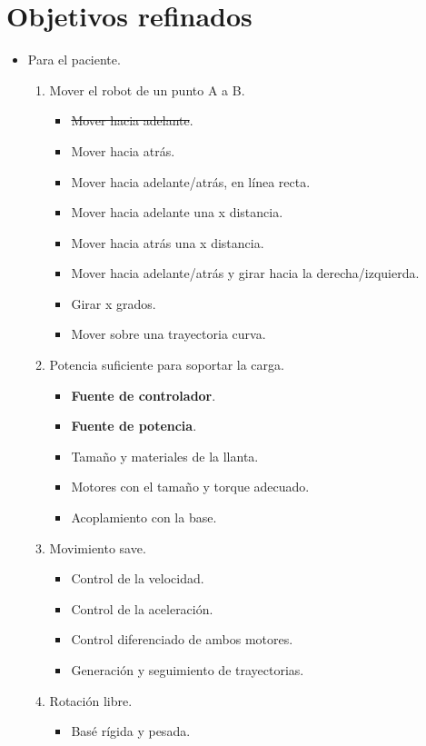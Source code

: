 \section{Objetivos refinados}
\begin{itemize}
	\item Para el paciente.
		\begin{enumerate}
			\item Mover el robot de un punto A a B.
				\begin{itemize}
					\item \st{Mover hacia adelante}.
					\item Mover hacia atrás.
					\item Mover hacia adelante/atrás, en línea
						recta.
					\item Mover hacia adelante una x distancia.
					\item Mover hacia atrás una x distancia.
					\item Mover hacia adelante/atrás y girar hacia
						la derecha/izquierda.
					\item Girar x grados.
					\item Mover sobre una trayectoria curva.
				\end{itemize}
			\item Potencia suficiente para soportar la carga.
				\begin{itemize}
					\item \textbf{Fuente de controlador}.
					\item \textbf{Fuente de potencia}.
					\item Tamaño y materiales de la llanta.
					\item Motores con el tamaño y torque adecuado.
					\item Acoplamiento con la base.
				\end{itemize}
			\item Movimiento save.
				\begin{itemize}
					\item Control de la velocidad.
					\item Control de la aceleración.
					\item Control diferenciado de ambos motores.
					\item Generación y seguimiento de trayectorias.
				\end{itemize}
			\item Rotación libre.
				\begin{itemize}
					\item Basé rígida y pesada.

\end{itemize}
\end{enumerate}
\end{itemize}
